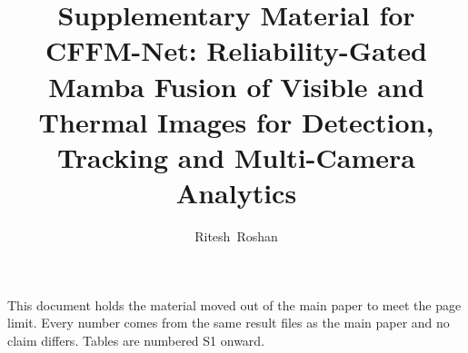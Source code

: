 \documentclass[journal]{IEEEtran}
\begin{document}
\title{Supplementary Material for CFFM-Net: Reliability-Gated Mamba Fusion of Visible and Thermal Images for Detection, Tracking and Multi-Camera Analytics}
\author{Ritesh~Roshan}
\maketitle

This document holds the material moved out of the main paper to meet the page limit. Every number comes from the same result files as the main paper and no claim differs. Tables are numbered S1 onward.


\end{document}
